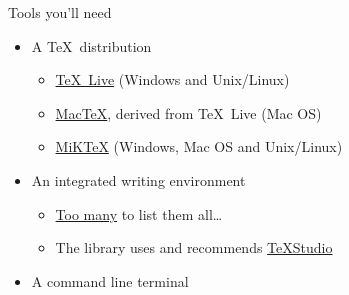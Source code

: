 \begin{frame}[c]{Tools you'll need}
	
	\begin{itemize}
		\item A \TeX\ distribution
			\begin{itemize}
				\item \href{https://www.tug.org/texlive/}{\TeX\ Live} (Windows and Unix/Linux)
				\item \href{https://www.tug.org/mactex/}{Mac\TeX}, derived from \TeX\ Live (Mac OS)
				\item \href{https://miktex.org/}{MiK\TeX} (Windows, Mac OS and Unix/Linux)
			\end{itemize}
		\item An integrated writing environment
			\begin{itemize}
				\item \href{https://en.wikipedia.org/wiki/Comparison_of_TeX_editors}{Too many} to list them all\ldots
				\item The library uses and recommends \href{https://www.texstudio.org/}{%
					\TeX Studio}
			\end{itemize}
		\item A command line terminal
	\end{itemize}
\end{frame}